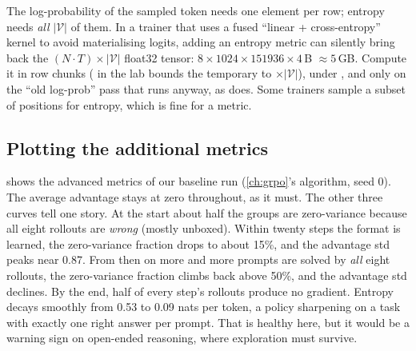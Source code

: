 \begin{systemslens}
The log-probability of the sampled token needs one element per row; entropy needs \emph{all}
$|\mathcal V|$ of them. In a trainer that uses a fused ``linear + cross-entropy'' kernel to
avoid materialising logits, adding an entropy metric can silently bring back the
$(N\cdot T)\times|\mathcal V|$ float32 tensor: $8\times1024\times\num{151936}\times4$\,B
$\approx5$\,GB. Compute it in row chunks ( in the lab bounds
the temporary to $\times|\mathcal V|$), under , and only on the
``old log-prob'' pass that runs anyway, as  does. Some trainers sample a
subset of positions for entropy, which is fine for a metric.
\end{systemslens}

\subsection{Plotting the additional metrics}\label{sec:grpo2:plotadv}

 shows the advanced metrics of our baseline run (\cref{ch:grpo}'s
algorithm, seed 0). The average advantage stays at zero throughout, as it must. The other
three curves tell one story. At the start about half the groups are zero-variance because
all eight rollouts are \emph{wrong} (mostly unboxed). Within twenty steps the format is
learned, the zero-variance fraction drops to about 15\%, and the advantage std peaks near
0.87. From then on more and more prompts are solved by \emph{all} eight rollouts, the
zero-variance fraction climbs back above 50\%, and the advantage std declines. By the end,
half of every step's rollouts produce no gradient. Entropy decays smoothly from 0.53 to 0.09
nats per token, a policy sharpening on a task with exactly one right answer per prompt. That
is healthy here, but it would be a warning sign on open-ended reasoning, where exploration
must survive.

